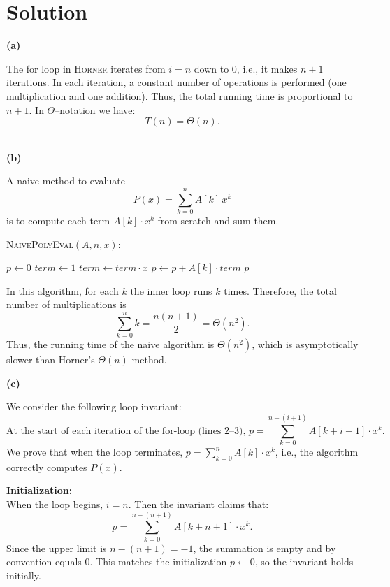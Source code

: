 \documentclass[11pt]{article}
\begin{document}
    \section*{Solution}

    \textbf{(a)}
    
    The for loop in \textsc{Horner} iterates from $i=n$ down to $0$, i.e., it makes $n+1$ iterations. In each iteration, a constant number of operations is performed (one multiplication and one addition). Thus, the total running time is proportional to $n+1$. In $\Theta$--notation we have:
    \[
    T(n)=\Theta(n).
    \]
    
    \vspace{2mm}
    \\
    \textbf{(b)}
    
    A naive method to evaluate
    \[
    P(x) = \sum_{k=0}^n A[k] \, x^k
    \]
    is to compute each term \(A[k] \cdot x^k\) from scratch and sum them. 
    
    \bigskip
    \textsc{NaivePolyEval}$(A, n, x)$:
    \begin{algorithmic}[1]
        \STATE $p \gets 0$
            \STATE $term \gets 1$
                \STATE $term \gets term \cdot x$
            \ENDFOR
            \STATE $p \gets p + A[k] \cdot term$
        \ENDFOR
        \RETURN $p$
    \end{algorithmic}
    \bigskip
    
    In this algorithm, for each $k$ the inner loop runs $k$ times. Therefore, the total number of multiplications is
    \[
    \sum_{k=0}^{n} k = \frac{n(n+1)}{2} = \Theta(n^2).
    \]
    Thus, the running time of the naive algorithm is $\Theta(n^2)$, which is asymptotically slower than Horner's $\Theta(n)$ method.
    
    \vspace{2mm}
    
    \textbf{(c)}
    
    We consider the following loop invariant:
    \[
    \text{At the start of each iteration of the for-loop (lines 2--3), } p = \sum_{k=0}^{n-(i+1)} A[k+i+1] \cdot x^k.
    \]
    We prove that when the loop terminates, $p = \sum_{k=0}^n A[k]\cdot x^k$, i.e., the algorithm correctly computes $P(x)$.
    
    \textbf{Initialization:} \\
    When the loop begins, $i = n$. Then the invariant claims that:
    \[
    p = \sum_{k=0}^{n-(n+1)} A[k+n+1] \cdot x^k.
    \]
    Since the upper limit is $n-(n+1) = -1$, the summation is empty and by convention equals $0$. This matches the initialization $p \gets 0$, so the invariant holds initially.
    
\end{document}

